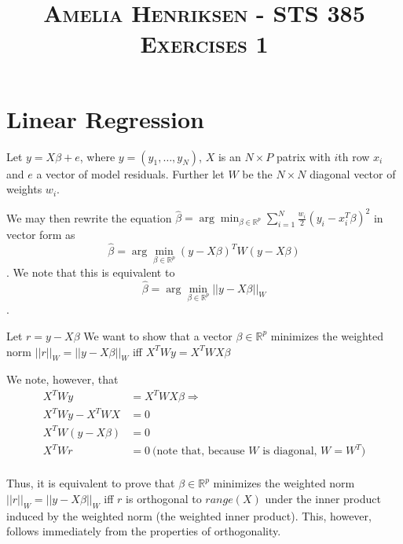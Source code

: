 \documentclass[12pt]{article}
\newcommand{\R}{\mathbb{R}}
\newenvironment{problem}[2][Exercise]{\begin{trivlist}
\item[\hskip \labelsep {\bfseries #1}\hskip \labelsep {\bfseries #2.}]}{\end{trivlist}}
\begin{document}
\author{}
\title{\normalsize \flushright \textsc{Amelia Henriksen - STS 385  Exercises 1 }}%
\date{}
\vspace{-1cm}
\maketitle
\vspace{-1cm}


\section*{Linear Regression}

\begin{problem}{A}
Let $y = X\beta + e$, where $y = (y_1, \ldots, y_N)$, $X$ is an $N \times P$ patrix with $i$th row $x_i$ and $e$ a vector of model residuals.
Further let $W$ be the $N \times N$ diagonal vector of weights $w_i$.

We may then rewrite the equation $\hat{\beta} = \arg \min_{\beta \in \R^p} \sum_{i=1}^{N} \frac{w_i}{2}(y_i - x_i^T \beta)^2$ in vector form as 
$$ \hat{\beta} = \arg \min_{\beta \in \R^p} (y - X\beta)^T W (y-X\beta)$$.
We note that this is equivalent to 
$$\hat{\beta} = \arg \min_{\beta \in \R^p} || y - X\beta||_W$$.

Let $r = y - X\beta$
We want to show that a vector $\beta \in \R^p$ minimizes the weighted norm $||r||_W = || y - X\beta||_W$ iff $X^TWy = X^TWX\beta$

We note, however, that 
\begin{align*}
X^TWy &= X^TWX\beta \Rightarrow\\
X^TWy - X^TWX &= 0\\
X^TW(y - X\beta) &= 0\\
X^TWr &= 0 \ \text{(note that, because $W$ is diagonal, $W = W^T$)}\\
\end{align*}

Thus, it is equivalent to prove that  $\beta \in \R^p$ minimizes the weighted norm $||r||_W = || y - X\beta||_W$ iff $r$ is orthogonal to $range(X)$ under the inner product induced by the weighted norm (the weighted inner product). This, however, follows immediately from the properties of orthogonality.


\end{problem}
\end{document}
